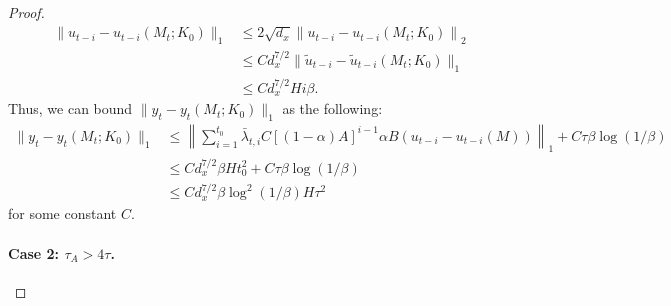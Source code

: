 \begin{proof}
\begin{align*}
\|u_{t-i}-u_{t-i}(M_t;K_0)\|_1&\le 2\sqrt{d_x}\left\|u_{t-i}-u_{t-i}(M_t;K_0)\right\|_2\\
&\le C d_x^{7/2}\|\tilde{u}_{t-i}-\tilde{u}_{t-i}(M_t;K_0)\|_1\\
&\le Cd_x^{7/2}Hi\beta.
\end{align*}
Thus, we can bound $\|y_t-y_t(M_t;K_0)\|_1$ as the following: 
\begin{align*}
\|y_t-y_t(M_t;K_0)\|_1&\le \left\|\sum_{i=1}^{t_0}\bar{\lambda}_{t,i}C[(1-\alpha)A]^{i-1}\alpha B(u_{t-i}-u_{t-i}(M))\right\|_1+C\tau\beta\log(1/\beta)\\
&\le Cd_x^{7/2}\beta H t_0^2 +C\tau\beta\log(1/\beta)\\
&\le Cd_x^{7/2}\beta \log^2(1/\beta) H\tau^2
\end{align*}
for some constant $C$.


\paragraph{Case 2: $\tau_A>4\tau$.} 


\end{proof}
